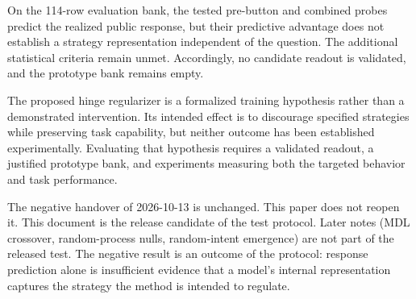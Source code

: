 \documentclass[11pt,a4paper]{article}
\begin{document}
On the 114-row evaluation bank, the tested pre-button and combined
probes predict the realized public response, but their predictive
advantage does not establish a strategy representation independent of
the question. The additional statistical criteria remain unmet.
Accordingly, no candidate readout is validated, and the prototype bank
remains empty.

The proposed hinge regularizer is a formalized training hypothesis
rather than a demonstrated intervention. Its intended effect is to
discourage specified strategies while preserving task capability, but
neither outcome has been established experimentally. Evaluating that
hypothesis requires a validated readout, a justified prototype bank, and
experiments measuring both the targeted behavior and task performance.

The negative handover of 2026-10-13 is unchanged. This paper does not
reopen it. This document is the release candidate of the test protocol.
Later notes (MDL crossover, random-process nulls, random-intent
emergence) are not part of the released test. The negative result is an
outcome of the protocol: response prediction alone is insufficient
evidence that a model's internal representation captures the strategy
the method is intended to regulate.
\end{document}
